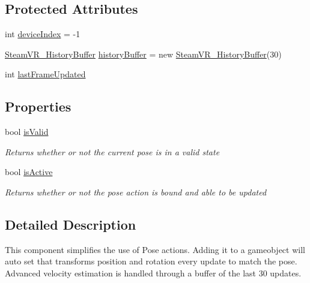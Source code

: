 \subsection*{Protected Attributes}
\begin{DoxyCompactItemize}
\item 
int \mbox{\hyperlink{class_valve_1_1_v_r_1_1_steam_v_r___behaviour___pose_a121b91b11f202d7dbca360a8a3b59af8}{device\+Index}} = -\/1
\item 
\mbox{\hyperlink{class_valve_1_1_v_r_1_1_steam_v_r___history_buffer}{Steam\+V\+R\+\_\+\+History\+Buffer}} \mbox{\hyperlink{class_valve_1_1_v_r_1_1_steam_v_r___behaviour___pose_a41166eb791fb24922ce00e39c3c906d0}{history\+Buffer}} = new \mbox{\hyperlink{class_valve_1_1_v_r_1_1_steam_v_r___history_buffer}{Steam\+V\+R\+\_\+\+History\+Buffer}}(30)
\item 
int \mbox{\hyperlink{class_valve_1_1_v_r_1_1_steam_v_r___behaviour___pose_a8eda899639df2ab346fbc027c7e6e8da}{last\+Frame\+Updated}}
\end{DoxyCompactItemize}
\subsection*{Properties}
\begin{DoxyCompactItemize}
\item 
bool \mbox{\hyperlink{class_valve_1_1_v_r_1_1_steam_v_r___behaviour___pose_a703ee83cb05c779ce0098824374a4fb1}{is\+Valid}}
\begin{DoxyCompactList}\small\item\em Returns whether or not the current pose is in a valid state \end{DoxyCompactList}\item 
bool \mbox{\hyperlink{class_valve_1_1_v_r_1_1_steam_v_r___behaviour___pose_a76fabf036c82c1731feaaa24244bc653}{is\+Active}}
\begin{DoxyCompactList}\small\item\em Returns whether or not the pose action is bound and able to be updated \end{DoxyCompactList}\end{DoxyCompactItemize}


\subsection{Detailed Description}
This component simplifies the use of Pose actions. Adding it to a gameobject will auto set that transform\textquotesingle{}s position and rotation every update to match the pose. Advanced velocity estimation is handled through a buffer of the last 30 updates. 



